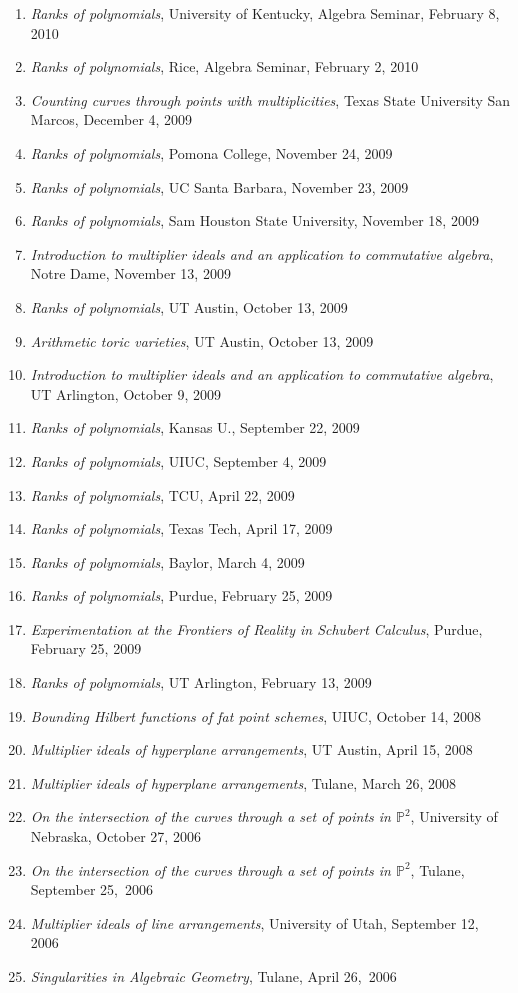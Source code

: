 \documentclass[12pt]{article}
\begin{document}
\begin{enumerate}[revarabic]
\item \textit{Ranks of polynomials},
University of Kentucky, Algebra Seminar, February 8, 2010
\item \textit{Ranks of polynomials},
Rice, Algebra Seminar, February 2, 2010
\item \textit{Counting curves through points with multiplicities},
Texas State University San Marcos, December 4, 2009
\item \textit{Ranks of polynomials},
Pomona College, November 24, 2009
\item \textit{Ranks of polynomials},
UC Santa Barbara, November 23, 2009
\item \textit{Ranks of polynomials},
Sam Houston State University, November 18, 2009
\item \textit{Introduction to multiplier ideals and an application to commutative algebra},
Notre Dame, November 13, 2009
\item \textit{Ranks of polynomials},
UT Austin, October 13, 2009
\item \textit{Arithmetic toric varieties},
UT Austin, October 13, 2009
\item \textit{Introduction to multiplier ideals and an application to commutative algebra},
UT Arlington, October 9, 2009
\item \textit{Ranks of polynomials},
Kansas U., September 22, 2009
\item \textit{Ranks of polynomials},
UIUC, September 4, 2009
\item \textit{Ranks of polynomials},
TCU, April 22, 2009
\item \textit{Ranks of polynomials},
Texas Tech, April 17, 2009
\item \textit{Ranks of polynomials},
Baylor, March 4, 2009
\item \textit{Ranks of polynomials},
Purdue, February 25, 2009
\item \textit{Experimentation at the Frontiers of Reality in Schubert Calculus},
Purdue, February 25, 2009
\item \textit{Ranks of polynomials},
UT Arlington, February 13, 2009
\item \textit{Bounding Hilbert functions of fat point schemes},
UIUC, October 14, 2008
\item \textit{Multiplier ideals of hyperplane arrangements},
UT Austin, April 15, 2008
\item \textit{Multiplier ideals of hyperplane arrangements},
Tulane, March 26, 2008
\item \textit{On the intersection of the curves through a set of points in $\mathbb{P}^2$},
University of Nebraska, October 27, 2006
\item \textit{On the intersection of the curves through a set of points in $\mathbb{P}^2$},
Tulane, September 25,~2006
\item \textit{Multiplier ideals of line arrangements}, University of Utah, September 12, 2006
\item \textit{Singularities in Algebraic Geometry}, Tulane, April 26,~2006
\end{enumerate}
\end{document}
